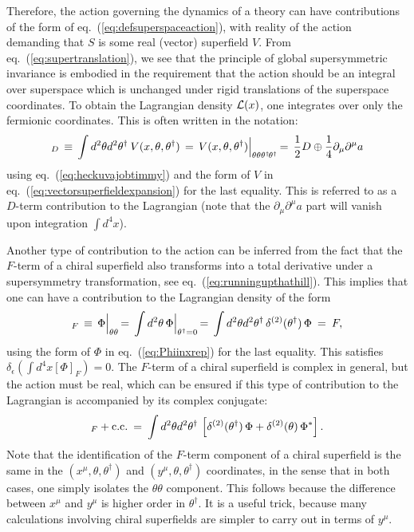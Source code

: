 \documentclass[11pt]{article}
\def\BDminus{-}
\def\BDminus{+}
\def\BDminus{\ominus}
\def\BDminus{\oplus}
\newcommand{\thdthd}{\theta^\dagger\hspace{-1pt}\theta^\dagger}
\def\beq{\begin{eqnarray}}
\def\eeq{\end{eqnarray}}
\begin{document}
Therefore, the action governing the dynamics of a theory can have 
contributions of the form of eq.~(\ref{eq:defsuperspaceaction}), with 
reality of the action demanding that $S$ is some real (vector) superfield 
$V$. From eq.~(\ref{eq:supertranslation}), we see that the principle of 
global supersymmetric invariance is embodied in the requirement that the 
action should be an integral over superspace which is unchanged under 
rigid translations of the superspace coordinates. To obtain the 
Lagrangian density ${\cal L}(x)$, one integrates over only the fermionic 
coordinates. This is often written in the notation:
\beq
[V]_D \,\equiv\, \int d^2\theta d^2\theta^\dagger\> V(x,\theta,\theta^\dagger) 
\,=\, 
V(x,\theta,\theta^\dagger) \Bigl |_{\theta\theta\thdthd}
\,=\,
\frac{1}{2} D \BDminus \frac{1}{4} \partial_\mu \partial^\mu a
\label{eq:DtermLag}
\eeq
using eq.~(\ref{eq:heckuvajobtimmy}) and the form of $V$ 
in eq.~(\ref{eq:vectorsuperfieldexpansion}) for the last equality. This is 
referred to as a 
$D$-term contribution to the Lagrangian
(note that the $\partial_\mu \partial^\mu a$ part will 
vanish upon integration $\int d^4 x$). 

Another type of contribution to the action can be inferred from the fact 
that the $F$-term of a chiral superfield also transforms into a total 
derivative under a supersymmetry transformation, see 
eq.~(\ref{eq:runningupthathill}). 
This implies that 
one can have a 
contribution to the Lagrangian density of the form
\beq
[\Phi]_F \,\equiv\, \Phi \Bigl |_{\theta\theta} \,=\, 
\int d^2\theta\, \Phi \Bigl |_{\theta^\dagger =0} \,=\, 
\int d^2\theta d^2\theta^\dagger\,
\delta^{(2)}(\theta^\dagger)
\,
\Phi \>=\>F,
\label{eq:PhiF}
\eeq
using the form of $\Phi$ in eq.~(\ref{eq:Phiinxrep}) for the last equality.
This satisfies $\delta_{\epsilon} (\int d^4 x [\Phi]_F) = 0$.
The $F$-term of a chiral superfield 
is complex in general, but 
the action must be real, which can be ensured if  
this type of contribution to the Lagrangian is accompanied
by its complex conjugate:
\beq
[\Phi]_F + {\rm c.c.} \>=\> 
\int d^2\theta d^2\theta^\dagger\,
\left [ 
\delta^{(2)}(\theta^\dagger) 
\,
\Phi 
+
\delta^{(2)}(\theta) 
\,
\Phi^* 
\right ].
\label{eq:FtermLag}
\eeq
Note that the identification of the $F$-term component of a chiral superfield is 
the same in the $(x^\mu,\theta,\theta^\dagger)$ and 
$(y^\mu,\theta,\theta^\dagger)$ coordinates, in the sense that in both cases, one 
simply isolates the $\theta\theta$ component. This follows because the 
difference between $x^\mu$ and $y^\mu$ is higher order in 
$\theta^\dagger$. It is a useful trick, because many 
calculations involving chiral superfields are 
simpler to carry out in terms of $y^\mu$.
\end{document}
